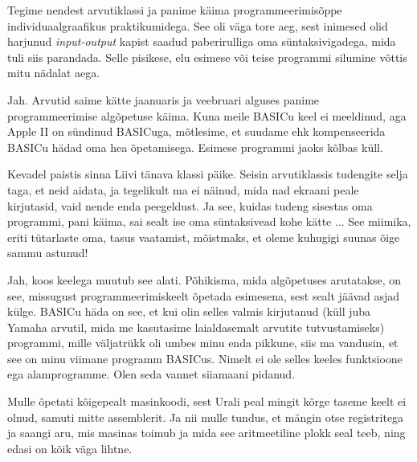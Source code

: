 Tegime nendest arvutiklassi ja panime käima 
programmeerimisõppe individuaalgraafikus praktikumidega. See oli väga 
tore aeg, sest inimesed olid harjunud \emph{input-output} kapist saadud paberirulliga oma süntaksivigadega, mida tuli siis parandada. 
Selle pisikese, elu esimese või teise programmi silumine võttis mitu 
nädalat aega. 


Jah. Arvutid saime kätte jaanuaris ja veebruari alguses panime 
programmeerimise algõpetuse käima. Kuna meile BASICu keel ei 
meeldinud, aga Apple II on sündinud BASICuga, mõtlesime, et 
suudame ehk kompenseerida BASICu hädad oma hea õpetamisega. Esimese 
programmi jaoks kõlbas küll. 

Kevadel paistis sinna Liivi tänava klassi päike. Seisin arvutiklassis tudengite 
selja taga, et neid aidata, ja tegelikult ma ei näinud, mida nad 
ekraani peale kirjutasid, vaid nende enda peegeldust. Ja see, kuidas tudeng 
sisestas oma programmi, pani käima, sai sealt ise oma süntaksivead kohe kätte ... 
See miimika, eriti tütarlaste oma, tasus vaatamist, mõistmaks, et oleme kuhugigi suunas õige sammu astunud! 


Jah, koos keelega muutub see alati. Põhikisma, mida algõpetuses arutatakse, on 
see, missugust programmeerimiskeelt õpetada esimesena, sest sealt jäävad 
asjad külge. BASICu häda on see, et kui olin selles
valmis kirjutanud (küll juba Yamaha arvutil, mida me kasutasime laialdasemalt 
arvutite tutvustamiseks) programmi, mille väljatrükk oli umbes minu enda 
pikkune, siis ma vandusin, et see on minu viimane programm BASICus. Nimelt ei ole selles keeles 
funktsioone ega alamprogramme. Olen seda vannet siiamaani pidanud. 

Mulle õpetati kõigepealt masinkoodi, sest Urali 
peal mingit kõrge taseme keelt ei olnud, samuti mitte assemblerit. Ja nii 
mulle tundus, et mängin otse registritega ja 
saangi aru, mis masinas toimub ja mida see aritmeetiline plokk seal teeb, ning edasi on kõik väga lihtne. 

